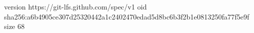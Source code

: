 version https://git-lfs.github.com/spec/v1
oid sha256:a6b4905ce307d25320442a1c2402470edad5d8bc6b3f2b1e0813250fa77f5e9f
size 68
